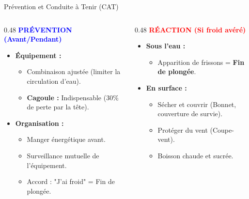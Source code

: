 \begin{frame}{Prévention et Conduite à Tenir (CAT)}
    \begin{columns}[t] %
        
        \begin{column}{0.48\textwidth}
            \textbf{\textcolor{blue}{PRÉVENTION (Avant/Pendant)}}
            \begin{itemize}
                \item \textbf{Équipement :}
                    \begin{itemize}
                        \item Combinaison ajustée (limiter la circulation d'eau).
                        \item \textbf{Cagoule :} Indispensable (30\% de perte par la tête).
                    \end{itemize}
                \item \textbf{Organisation :}
                    \begin{itemize}
                        \item Manger énergétique avant.
                        \item Surveillance mutuelle de l'équipement.
                        \item Accord : "J'ai froid" = Fin de plongée.
                    \end{itemize}
            \end{itemize}
        \end{column}

        \begin{column}{0.48\textwidth}
            \textbf{\textcolor{red}{RÉACTION (Si froid avéré)}}
            \begin{itemize}
                \item \textbf{Sous l'eau :}
                    \begin{itemize}
                        \item Apparition de frissons = \textbf{Fin de plongée}.
                    \end{itemize}
                \item \textbf{En surface :}
                    \begin{itemize}
                        \item Sécher et couvrir (Bonnet, couverture de survie).
                        \item Protéger du vent (Coupe-vent).
                        \item Boisson chaude et sucrée.
                    \end{itemize}
            \end{itemize}
        \end{column}
        

\end{columns}
\end{frame}
